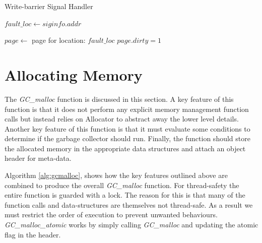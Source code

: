 \documentclass[../diss.tex]{subfiles}
\begin{document}
\begin{algorithm}
\caption{Write-barrier Signal Handler}
\label{alg:wbsignal}
\begin{algorithmic}


\State \Return
\EndIf

\State $\mathit{fault\_loc}\gets \mathit{siginfo}.addr$

\State $page\gets$ page for location: $\mathit{fault\_loc}$
\State $page.dirty = 1$
\State {}

\EndFunction

\end{algorithmic}
\end{algorithm}


\section{Allocating Memory}
\label{sec:gcmalloc}

The \emph{GC\_malloc} function is discussed in this section. A key feature of this function is that it does not perform any explicit memory management function calls but instead relies on Allocator to abstract away the lower level details. Another key feature of this function is that it must evaluate some conditions to determine if the garbage collector should run. Finally, the function should store the allocated memory in the appropriate data structures and attach an object header for meta-data.

Algorithm \ref{alg:gcmalloc}, shows how the key features outlined above are combined to produce the overall \emph{GC\_malloc} function. For thread-safety the entire function is guarded with a lock. The reason for this is that many of the function calls and data-structures are themselves not thread-safe. As a result we must restrict the order of execution to prevent unwanted behaviours. \emph{GC\_malloc\_atomic} works by simply calling \emph{GC\_malloc} and updating the atomic flag in the header.
\end{document}
